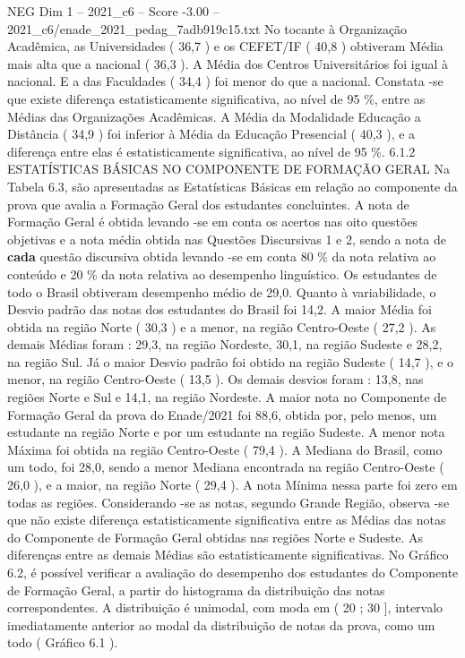 \begin{textsample}{NEG Dim 1 – 2021\_c6 – Score -3.00 – 2021\_c6/enade\_2021\_pedag\_7adb919c15.txt}
No tocante à Organização Acadêmica, as Universidades ( 36,7 ) e os CEFET/IF ( 40,8 ) obtiveram Média mais alta que a nacional ( 36,3 ).
A Média dos Centros Universitários foi igual à nacional.
E a das Faculdades ( 34,4 ) foi menor do que a nacional.
Constata -se que existe diferença estatisticamente significativa, ao nível de 95 \%, entre as Médias das Organizações Acadêmicas.
A Média da Modalidade Educação a Distância ( 34,9 ) foi inferior à Média da Educação Presencial ( 40,3 ), e a diferença entre elas é estatisticamente significativa, ao nível de 95 \%. 6.1.2 ESTATÍSTICAS BÁSICAS NO COMPONENTE DE FORMAÇÃO GERAL Na Tabela 6.3, são apresentadas as Estatísticas Básicas em relação ao componente da prova que avalia a Formação Geral dos estudantes concluintes.
A nota de Formação Geral é obtida levando -se em conta os acertos nas oito questões objetivas e a nota média obtida nas Questões Discursivas 1 e 2, sendo a nota de \textbf{cada} questão discursiva obtida levando -se em conta 80 \% da nota relativa ao conteúdo e 20 \% da nota relativa ao desempenho linguístico.
Os estudantes de todo o Brasil obtiveram desempenho médio de 29,0.
Quanto à variabilidade, o Desvio padrão das notas dos estudantes do Brasil foi 14,2.
A maior Média foi obtida na região Norte ( 30,3 ) e a menor, na região Centro-Oeste ( 27,2 ).
As demais Médias foram : 29,3, na região Nordeste, 30,1, na região Sudeste e 28,2, na região Sul.
Já o maior Desvio padrão foi obtido na região Sudeste ( 14,7 ), e o menor, na região Centro-Oeste ( 13,5 ).
Os demais desvios foram : 13,8, nas regiões Norte e Sul e 14,1, na região Nordeste.
A maior nota no Componente de Formação Geral da prova do Enade/2021 foi 88,6, obtida por, pelo menos, um estudante na região Norte e por um estudante na região Sudeste.
A menor nota Máxima foi obtida na região Centro-Oeste ( 79,4 ).
A Mediana do Brasil, como um todo, foi 28,0, sendo a menor Mediana encontrada na região Centro-Oeste ( 26,0 ), e a maior, na região Norte ( 29,4 ).
A nota Mínima nessa parte foi zero em todas as regiões.
Considerando -se as notas, segundo Grande Região, observa -se que não existe diferença estatisticamente significativa entre as Médias das notas do Componente de Formação Geral obtidas nas regiões Norte e Sudeste.
As diferenças entre as demais Médias são estatisticamente significativas.
No Gráfico 6.2, é possível verificar a avaliação do desempenho dos estudantes do Componente de Formação Geral, a partir do histograma da distribuição das notas correspondentes.
A distribuição é unimodal, com moda em ( 20 ; 30 ], intervalo imediatamente anterior ao modal da distribuição de notas da prova, como um todo ( Gráfico 6.1 ).

\end{textsample}
